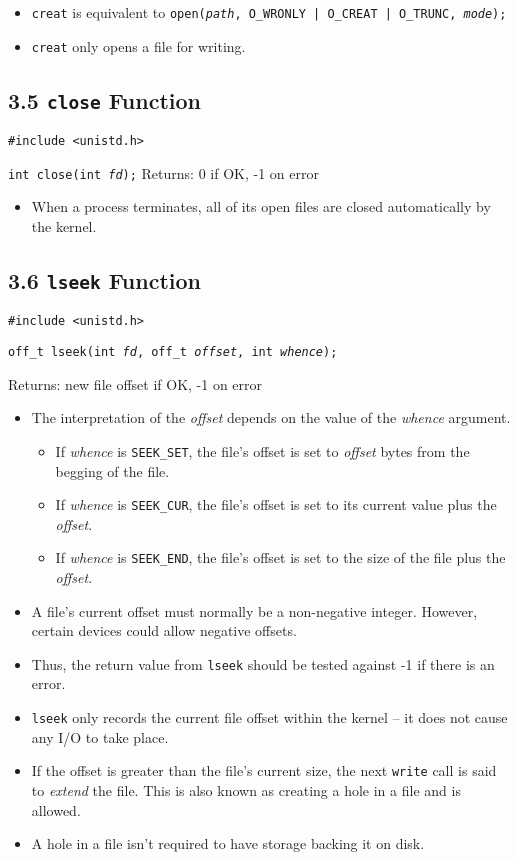 \documentclass[]{article}
\newcommand{\code}{\texttt}
\begin{document}
\begin{itemize}
\item \code{creat} is equivalent to \code{open(\emph{path}, O\_WRONLY | O\_CREAT
| O\_TRUNC, \emph{mode});}
\item \code{creat} only opens a file for writing.
\end{itemize}

\subsection*{3.5 \code{close} Function}
\code{\#include <unistd.h>}

\code{int close(int \emph{fd});}
Returns: 0 if OK, -1 on error

\begin{itemize}
\item When a process terminates, all of its open files are closed automatically
by the kernel.
\end{itemize}

\subsection*{3.6 \code{lseek} Function}
\code{\#include <unistd.h>}

\code{off\_t lseek(int \emph{fd}, off\_t \emph{offset}, int \emph{whence});}

Returns: new file offset if OK, -1 on error

\begin{itemize}
\item The interpretation of the \emph{offset} depends on the value of the
\emph{whence} argument.
\begin{itemize}
\item If \emph{whence} is \code{SEEK\_SET}, the file's offset is set to
\emph{offset} bytes from the begging of the file.
\item If \emph{whence} is \code{SEEK\_CUR}, the file's offset is set to its
current value plus the \emph{offset}.
\item If \emph{whence} is \code{SEEK\_END}, the file's offset is set to the size
of the file plus the \emph{offset}.
\end{itemize}
\item A file's current offset must normally be a non-negative integer. However,
certain devices could allow negative offsets.
\item Thus, the return value from \code{lseek} should be tested against -1 if
there is an error.
\item \code{lseek} only records the current file offset within the kernel -- it
does not cause any I/O to take place.
\item If the offset is greater than the file's current size, the next
\code{write} call is said to \emph{extend} the file. This is also known as
creating a hole in a file and is allowed.
\item A hole in a file isn't required to have storage backing it on disk.
\end{itemize}
\end{document}
